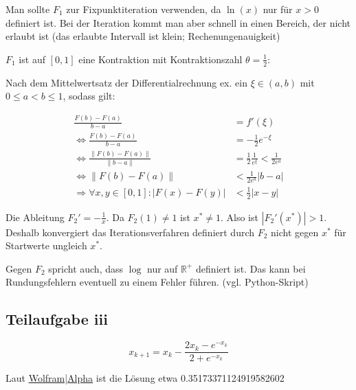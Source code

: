 Man sollte $F_1$ zur Fixpunktiteration verwenden, da $\ln(x)$ nur für
$x>0$ definiert ist. Bei der Iteration kommt man aber schnell in
einen Bereich, der nicht erlaubt ist (das erlaubte Intervall ist klein;
Rechenungenauigkeit)

$F_1$ ist auf $[0,1]$ eine Kontraktion mit Kontraktionszahl $\theta = \frac{1}{2}$:

Nach dem Mittelwertsatz der Differentialrechnung ex. ein $\xi \in (a,b)$ mit $ 0 \leq a < b \leq 1$, sodass 
gilt:


\begin{align}
    \frac{F(b) - F(a)}{b-a} &= f'(\xi) \\
    \Leftrightarrow \frac{F(b) - F(a)}{b-a} &= - \frac{1}{2} e^{- \xi} \\
    \Leftrightarrow \frac{\|F(b) - F(a)\|}{\|b-a\|} &= \frac{1}{2} \frac{1}{e^{\xi}} < \frac{1}{2 e^a} \\
    \Leftrightarrow \|F(b) - F(a)\| &< \frac{1}{2 e^a} |b-a|\\
    \Rightarrow \forall x, y \in [0,1]: |F(x) - F(y)| &< \frac{1}{2} |x-y|
\end{align}

Die Ableitung $F_2' = -\frac{1}{x}$. Da $F_2(1) \neq 1$ ist $x^* \neq 1$.
Also ist $|F_2'(x^*)| > 1$. Deshalb konvergiert das Iterationsverfahren
definiert durch $F_2$ nicht gegen $x^*$ für Startwerte ungleich $x^*$.

Gegen $F_2$ spricht auch, dass $\log$ nur auf $\mathbb{R}^+$ definiert
ist. Das kann bei Rundungsfehlern eventuell zu einem Fehler führen.
(vgl. Python-Skript)

\subsection*{Teilaufgabe iii}
\[x_{k+1} = x_k - \frac{2x_k - e^{-x_k}}{2 + e^{-x_k}}\]

Laut \href{http://www.wolframalpha.com/input/?i=2x-e%5E(-x)%3D0}{Wolfram|Alpha} ist die Lösung etwa 0.35173371124919582602
